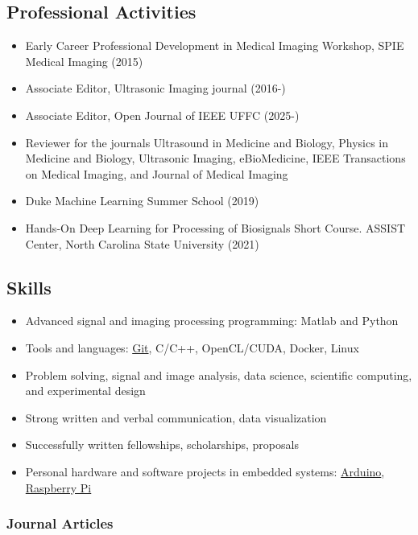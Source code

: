 \documentclass[
]{article}
\providecommand{\tightlist}{%
  \setlength{\itemsep}{0pt}\setlength{\parskip}{0pt}}
\begin{document}
\subsection{Professional Activities}\label{professional-activities}

\begin{itemize}
\tightlist
\item
  Early Career Professional Development in Medical Imaging Workshop,
  SPIE Medical Imaging (2015)
\item
  Associate Editor, Ultrasonic Imaging journal (2016-)
\item
  Associate Editor, Open Journal of IEEE UFFC (2025-)
\item
  Reviewer for the journals Ultrasound in Medicine and Biology, Physics
  in Medicine and Biology, Ultrasonic Imaging, eBioMedicine, IEEE
  Transactions on Medical Imaging, and Journal of Medical Imaging
\item
  Duke Machine Learning Summer School (2019)
\item
  Hands-On Deep Learning for Processing of Biosignals Short Course.
  ASSIST Center, North Carolina State University (2021)
\end{itemize}

\subsection{Skills}\label{skills}

\begin{itemize}
\tightlist
\item
  Advanced signal and imaging processing programming: Matlab and Python
\item
  Tools and languages: \href{http://git-scm.com/}{Git}, C/C++,
  OpenCL/CUDA, Docker, Linux
\item
  Problem solving, signal and image analysis, data science, scientific
  computing, and experimental design
\item
  Strong written and verbal communication, data visualization
\item
  Successfully written fellowships, scholarships, proposals
\item
  Personal hardware and software projects in embedded systems:
  \href{http://www.arduino.cc/}{Arduino},
  \href{http://www.raspberrypi.org/}{Raspberry Pi}
\end{itemize}

\subsubsection{Journal Articles}\label{journal-articles}
\end{document}
